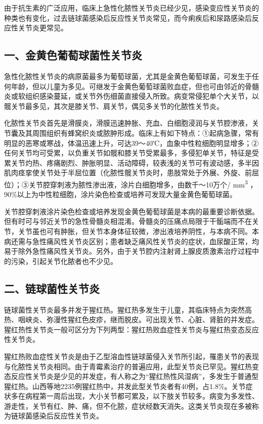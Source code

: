 由于抗生素的广泛应用，临床上急性化脓性关节炎已经少见，感染变应性关节炎的种类也有变化，过去链球菌感染后反应性关节炎常见，而今痢疾后和尿路感染后反应性关节炎更常见。

\subsection{一、金黄色葡萄球菌性关节炎}

急性化脓性关节炎的病原菌最多为葡萄球菌，尤其是金黄色葡萄球菌，可发生于任何年龄，但以儿童为多见。可继发于金黄色葡萄球菌败血症，但也可由邻近的骨髓炎或软组织感染蔓延，或关节外伤细菌直接侵入所致。病变常侵犯单个大关节，以髋关节最多见，其次是膝关节、肩关节，偶见多关节的化脓性关节炎。

化脓性关节炎首先是滑膜炎，滑膜迅速肿胀、充血、白细胞浸润与关节腔渗液，关节囊及其周围组织有蜂窝织炎或脓肿形成。临床上有如下特点：①起病急骤，常有明显的恶寒或寒战，体温迅速上升，可达39～40℃，血象中性粒细胞明显增多；②任何关节均可受累，以负重关节如髋和膝关节受累最多，多侵犯单关节，特征是受累关节灼热、疼痛剧烈、肿胀明显、活动障碍，较表浅的关节可有波动感，多半因肌肉痉挛使关节处于半屈位置（化脓性髋关节炎时，患肢常处于外展、外旋、前屈位）；③关节腔穿刺液为脓性渗出液，涂片白细胞增多，由数千～10万个/
mm\textsuperscript{3}
，90\%以上为中性粒细胞，涂片染色检查或培养可发现大量金黄色葡萄球菌。

关节腔穿刺液涂片染色检查或培养发现金黄色葡萄球菌是本病的最重要诊断依据。但有时可与邻近关节的急性骨髓炎相混淆。骨髓炎的压痛点局限于干骺端而不在关节，关节虽也可有肿胀，但关节本身体征较微，渗出液培养阴性，与本病不同。本病还需与急性痛风性关节炎区别；患者缺乏痛风性关节炎的症状，血尿酸正常，均易于除外急性痛风性关节炎。另外，由于关节腔内注射肾上腺皮质激素治疗过程中的污染，引起关节化脓者也不少见。

\subsection{二、链球菌性关节炎}

链球菌性关节炎最多并发于猩红热。猩红热多发生于儿童，其临床特点为突然高热、咽峡炎、弥漫性猩红色皮疹，继而脱皮。可出现关节、心脏、肾脏的并发症。猩红热性关节炎一般可区分为下列两型：猩红热败血症性关节炎与猩红热变态反应性关节炎。

猩红热败血症性关节炎是由于乙型溶血性链球菌侵入关节所引起，罹患关节的表现与化脓性关节炎相同。由于青霉素治疗的普遍应用，此型关节炎已罕见。猩红热变态反应性关节炎是少见的并发症，有人称之为“猩红热性风湿病”，多发生于普通型猩红热。山西等地2235例猩红热中，并发此型关节炎者有40例，占1.8\%。关节症状多在病程第一周后出现，大小关节都可累及，以下肢关节较多。病变为多发性、游走性，关节有红、肿、痛，但不化脓，症状经数天消失。这类关节炎现在多被称为链球菌感染后反应性关节炎。

